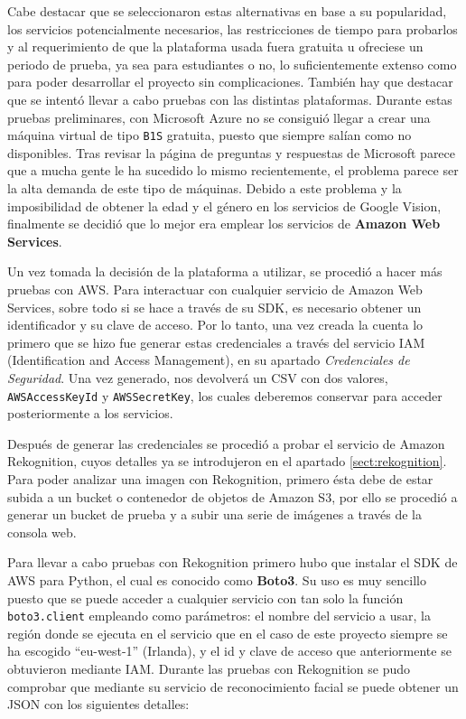 Cabe destacar que se seleccionaron estas alternativas en base a su popularidad, los servicios potencialmente necesarios, las restricciones de tiempo para probarlos y al requerimiento de que la plataforma usada fuera gratuita u ofreciese un periodo de prueba, ya sea para estudiantes o no, lo suficientemente extenso como para poder desarrollar el proyecto sin complicaciones. También hay que destacar que se intentó llevar a cabo pruebas con las distintas plataformas. Durante estas pruebas preliminares, con Microsoft Azure no se consiguió llegar a crear una máquina virtual de tipo \texttt{B1S} gratuita, puesto que siempre salían como no disponibles. Tras revisar la página de preguntas y respuestas de Microsoft parece que a mucha gente le ha sucedido lo mismo recientemente, el problema parece ser la alta demanda de este tipo de máquinas. Debido a este problema y la imposibilidad de obtener la edad y el género en los servicios de Google Vision, finalmente se decidió que lo mejor era emplear los servicios de \textbf{Amazon Web Services}.

Un vez tomada la decisión de la plataforma a utilizar, se procedió a hacer más pruebas con AWS. Para interactuar con cualquier servicio de Amazon Web Services, sobre todo si se hace a través de su SDK, es necesario obtener un identificador y su clave de acceso. Por lo tanto, una vez creada la cuenta lo primero que se hizo fue generar estas credenciales a través del servicio IAM (Identification and Access Management), en su apartado \textit{Credenciales de Seguridad}. Una vez generado, nos devolverá un CSV con dos valores, \texttt{AWSAccessKeyId} y \texttt{AWSSecretKey}, los cuales deberemos conservar para acceder posteriormente a los servicios.

Después de generar las credenciales se procedió a probar el servicio de Amazon Rekognition, cuyos detalles ya se introdujeron en el apartado \ref{sect:rekognition}. Para poder analizar una imagen con Rekognition, primero ésta debe de estar subida a un bucket o contenedor de objetos de Amazon S3, por ello se procedió a generar un bucket de prueba y a subir una serie de imágenes a través de la consola web.

Para llevar a cabo pruebas con Rekognition primero hubo que instalar el SDK de AWS para Python, el cual es conocido como \textbf{Boto3}. Su uso es muy sencillo puesto que se puede acceder a cualquier servicio con tan solo la función \texttt{boto3.client} empleando como parámetros: el nombre del servicio a usar, la región donde se ejecuta en el servicio que en el caso de este proyecto siempre se ha escogido ``eu-west-1'' (Irlanda), y el id y clave de acceso que anteriormente se obtuvieron mediante IAM. Durante las pruebas con Rekognition se pudo comprobar que mediante su servicio de reconocimiento facial se puede obtener un JSON con los siguientes detalles:

